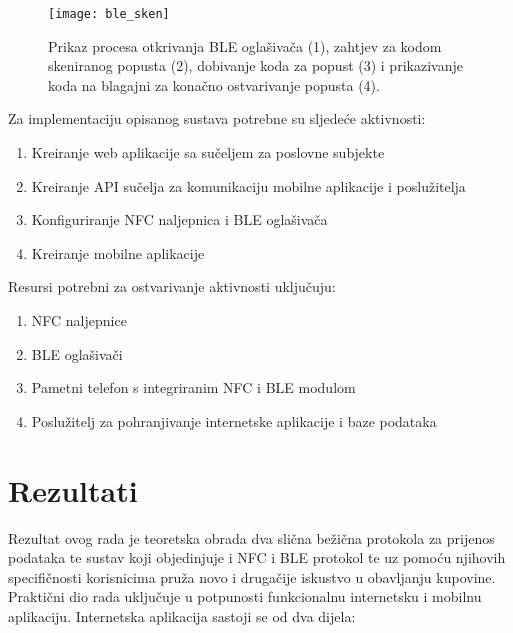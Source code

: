 \begin{figure}[!htbp]
	\begin{center}
 \texttt{[image: ble\_sken]}
 \caption{Prikaz procesa otkrivanja BLE ogla\v{s}iva\v{c}a (1), zahtjev za kodom skeniranog popusta (2), dobivanje koda za popust (3) i prikazivanje koda na blagajni za kona\v{c}no ostvarivanje popusta (4).}
 \label{fig:otkrivanjeBLEa}
	\end{center}
\end{figure}

Za implementaciju opisanog sustava potrebne su sljede\'{c}e aktivnosti:
\begin{enumerate}
	\item Kreiranje web aplikacije sa su\v{c}eljem za poslovne subjekte
	\item Kreiranje API su\v{c}elja za komunikaciju mobilne aplikacije i poslu\v{z}itelja
	\item Konfiguriranje NFC naljepnica i BLE ogla\v{s}iva\v{c}a
	\item Kreiranje mobilne aplikacije
	
\end{enumerate}

Resursi potrebni za ostvarivanje aktivnosti uklju\v{c}uju:
\begin{enumerate}
	\item NFC naljepnice
	\item BLE ogla\v{s}iva\v{c}i
	\item Pametni telefon s integriranim NFC i BLE modulom
	\item Poslu\v{z}itelj za pohranjivanje internetske aplikacije i baze podataka
\end{enumerate}


\section{Rezultati}

Rezultat ovog rada je teoretska obrada dva sli\v{c}na be\v{z}i\v{c}na protokola za prijenos podataka te sustav koji objedinjuje i NFC i BLE protokol te uz pomo\'{c}u njihovih specifi\v{c}nosti korisnicima pru\v{z}a novo i druga\v{c}ije iskustvo u obavljanju kupovine. Prakti\v{c}ni dio rada uklju\v{c}uje u potpunosti funkcionalnu internetsku i mobilnu aplikaciju. Internetska aplikacija  sastoji se od dva dijela:

